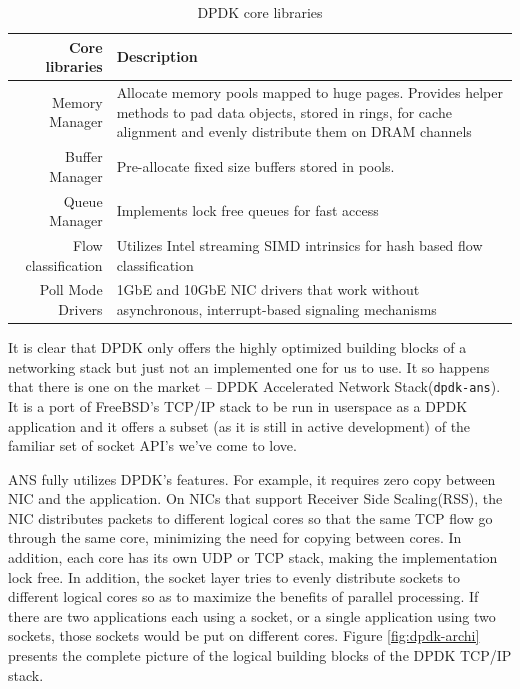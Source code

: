 \documentclass{sig-alternate-05-2015}
\begin{document}
\vspace*{-10pt}
\begin{table}[h]
\centering
\caption{DPDK core libraries}
\label{tab:dpdkcorelibs}
\begin{tabular}{|r|p{2in}|}
\hline
Core libraries      & Description                                                                                                                                       \\ \hline
Memory Manager      & Allocate memory pools mapped to huge pages. Provides helper methods to pad data objects, stored in rings, for cache alignment and evenly distribute them on DRAM channels \\ \hline
Buffer Manager      & Pre-allocate fixed size buffers stored in pools.                                                                                                  \\ \hline
Queue Manager       & Implements lock free queues for fast access                                                                                                       \\ \hline
Flow classification & Utilizes Intel streaming SIMD intrinsics for hash based flow classification                                                                       \\ \hline
Poll Mode Drivers    & 1GbE and 10GbE NIC drivers that work without asynchronous, interrupt-based signaling mechanisms                                                   \\ \hline
\end{tabular}
\end{table}

It is clear that DPDK only offers the highly optimized building blocks of a networking stack but just not an implemented one for us to use. It so happens that there is one on the market -- DPDK Accelerated Network Stack(\texttt{dpdk-ans}). It is a port of FreeBSD's TCP/IP stack to be run in userspace as a DPDK application and it offers a subset (as it is still in active development) of the familiar set of socket API's we've come to love.

ANS fully utilizes DPDK's features. For example, it requires zero copy between NIC and the application. On NICs that support Receiver Side Scaling(RSS), the NIC distributes packets to different logical cores so that the same TCP flow go through the same core, minimizing the need for copying between cores. In addition, each core has its own UDP or TCP stack, making the implementation lock free. In addition, the socket layer tries to evenly distribute sockets to different logical cores so as to maximize the benefits of parallel processing. If there are two applications each using a socket, or a single application using two sockets, those sockets would be put on different cores. Figure \ref{fig:dpdk-archi} presents the complete picture of the logical building blocks of the DPDK TCP/IP stack. \cite{dpdkans:readme}
 
\end{document}
